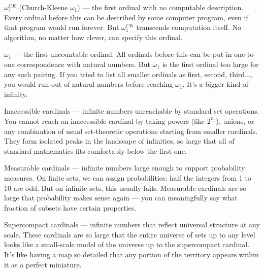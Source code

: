 $\omega_1^{CK}$ (Church-Kleene $\omega_1$) — the first ordinal with no computable description. Every ordinal before this can be described by some computer program, even if that program would run forever. But $\omega_1^{CK}$ transcends computation itself. No algorithm, no matter how clever, can specify this ordinal. 

$\omega_1$ — the first uncountable ordinal. All ordinals before this can be put in one-to-one correspondence with natural numbers. But $\omega_1$ is the first ordinal too large for any such pairing. If you tried to list all smaller ordinals as first, second, third..., you would run out of natural numbers before reaching $\omega_1$. It's a bigger kind of infinity.

Inaccessible cardinals — infinite numbers unreachable by standard set operations. You cannot reach an inaccessible cardinal by taking powers (like $2^{\aleph_0}$), unions, or any combination of usual set-theoretic operations starting from smaller cardinals. They form isolated peaks in the landscape of infinities, so large that all of standard mathematics fits comfortably below the first one.

Measurable cardinals — infinite numbers large enough to support probability measures. On finite sets, we can assign probabilities: half the integers from 1 to 10 are odd. But on infinite sets, this usually fails. Measurable cardinals are so large that probability makes sense again — you can meaningfully say what fraction of subsets have certain properties.

Supercompact cardinals — infinite numbers that reflect universal structure at any scale. These cardinals are so large that the entire universe of sets up to any level looks like a small-scale model of the universe up to the supercompact cardinal. It's like having a map so detailed that any portion of the territory appears within it as a perfect miniature.
